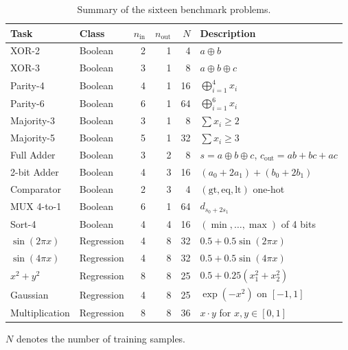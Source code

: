 \begin{table}[h]
  \centering
  \small
  \caption{Summary of the sixteen benchmark problems.}
  \label{tab:all-tasks}
  \begin{tabular}{llrrrl}
    \toprule
    \textbf{Task} & \textbf{Class} & $n_{\text{in}}$ & $n_{\text{out}}$
      & $N$ & \textbf{Description} \\
    \midrule
    XOR-2        & Boolean    & 2 & 1 &  4 & $a \oplus b$ \\
    XOR-3        & Boolean    & 3 & 1 &  8 & $a \oplus b \oplus c$ \\
    Parity-4     & Boolean    & 4 & 1 & 16 & $\bigoplus_{i=1}^4 x_i$ \\
    Parity-6     & Boolean    & 6 & 1 & 64 & $\bigoplus_{i=1}^6 x_i$ \\
    \midrule
    Majority-3   & Boolean    & 3 & 1 &  8 & $\sum x_i \geq 2$ \\
    Majority-5   & Boolean    & 5 & 1 & 32 & $\sum x_i \geq 3$ \\
    \midrule
    Full Adder   & Boolean    & 3 & 2 &  8 & $s = a \oplus b \oplus c$, $c_{\text{out}} = a b + b c + a c$ \\
    2-bit Adder  & Boolean    & 4 & 3 & 16 & $(a_0 + 2 a_1) + (b_0 + 2 b_1)$ \\
    Comparator   & Boolean    & 2 & 3 &  4 & $(\text{gt}, \text{eq}, \text{lt})$ one-hot \\
    MUX 4-to-1   & Boolean    & 6 & 1 & 64 & $d_{s_0 + 2 s_1}$ \\
    Sort-4       & Boolean    & 4 & 4 & 16 & $(\min, \ldots, \max)$ of 4 bits \\
    \midrule
    $\sin(2\pi x)$     & Regression & 4 & 8 & 32 & $0.5 + 0.5 \sin(2\pi x)$ \\
    $\sin(4\pi x)$     & Regression & 4 & 8 & 32 & $0.5 + 0.5 \sin(4\pi x)$ \\
    $x^2 + y^2$        & Regression & 8 & 8 & 25 & $0.5 + 0.25 (x_1^2 + x_2^2)$ \\
    Gaussian           & Regression & 4 & 8 & 25 & $\exp(-x^2)$ on $[-1,1]$ \\
    Multiplication     & Regression & 8 & 8 & 36 & $x \cdot y$ for $x,y \in [0,1]$ \\
    \bottomrule
  \end{tabular}
  \vspace{0.3em}
  \par\footnotesize{$N$ denotes the number of training samples.}
\end{table}

